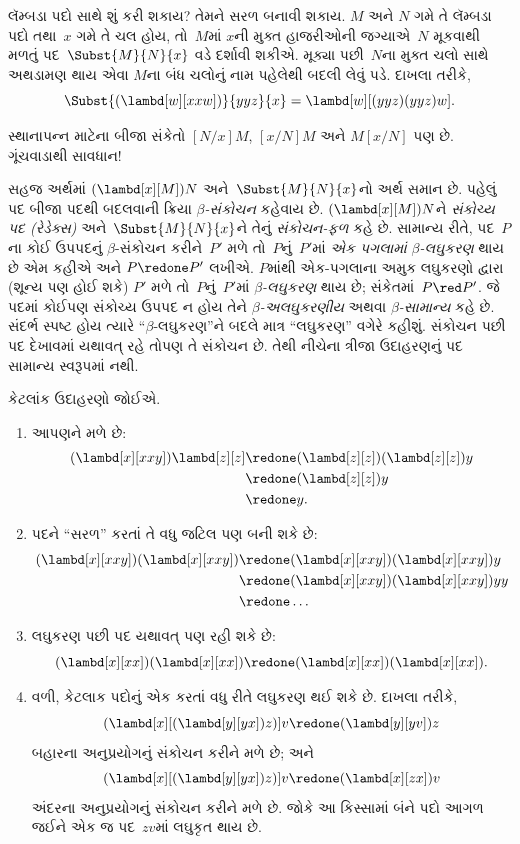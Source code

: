 \label{guunit:OLP-0345}


લૅમ્બડા પદો સાથે શું કરી શકાય? તેમને સરળ બનાવી શકાય.
$M$ અને $N$ ગમે તે લૅમ્બડા પદો તથા~$x$ ગમે તે ચલ હોય, તો~$M$માં
$x$ની મુક્ત હાજરીઓની જગ્યાએ~$N$ મૂકવાથી મળતું પદ~$\Subst{M}{N}{x}$ વડે
દર્શાવી શકીએ. મૂક્યા પછી~$N$ના મુક્ત ચલો સાથે અથડામણ થાય એવા
$M$ના બંધ ચલોનું નામ પહેલેથી બદલી લેવું પડે. દાખલા તરીકે,
\[
\Subst{(\lambd[w][xxw])}{yyz}{x} = \lambd[w][(yyz)(yyz)w].
\]

\begin{digress}
સ્થાનાપન્ન માટેના બીજા સંકેતો $[N/x]M$, $[x/N]M$ અને
$M[x/N]$ પણ છે. ગૂંચવાડાથી સાવધાન!
\end{digress}

સહજ અર્થમાં $(\lambd[x][M])N$ અને~$\Subst{M}{N}{x}$નો અર્થ
સમાન છે. પહેલું પદ બીજા પદથી બદલવાની ક્રિયા
\emph{$\beta$-સંકોચન} કહેવાય છે. $(\lambd[x][M])N$ને
\emph{સંકોચ્ય પદ (રેડેક્સ)} અને~$\Subst{M}{N}{x}$ને તેનું
\emph{સંકોચન-ફળ} કહે છે. સામાન્ય રીતે, પદ~$P$ના કોઈ ઉપપદનું
$\beta$-સંકોચન કરીને~$P'$ મળે તો~$P$નું~$P'$માં
\emph{એક પગલામાં $\beta$-લઘુકરણ} થાય છે એમ કહીએ અને
$P \redone P'$ લખીએ. $P$માંથી એક-પગલાના અમુક લઘુકરણો દ્વારા
(શૂન્ય પણ હોઈ શકે) $P'$ મળે તો~$P$નું~$P'$માં
\emph{$\beta$-લઘુકરણ} થાય છે; સંકેતમાં~$P \red P'$.
જે પદમાં કોઈપણ સંકોચ્ય ઉપપદ ન હોય તેને
\emph{$\beta$-અલઘુકરણીય} અથવા \emph{$\beta$-સામાન્ય}
કહે છે. સંદર્ભ સ્પષ્ટ હોય ત્યારે ``$\beta$-લઘુકરણ''ને બદલે
માત્ર ``લઘુકરણ'' વગેરે કહીશું.
સંકોચન પછી પદ દેખાવમાં યથાવત્ રહે તોપણ તે સંકોચન છે.
તેથી નીચેના ત્રીજા ઉદાહરણનું પદ સામાન્ય સ્વરૂપમાં નથી.

કેટલાંક ઉદાહરણો જોઈએ.
\begin{enumerate}
\item આપણને મળે છે:
\begin{align*}
(\lambd[x][xxy]) \lambd[z][z] & \redone (\lambd[z][z])(\lambd[z][z]) y \\
& \redone (\lambd[z][z]) y \\
& \redone y.
\end{align*}
\item પદને ``સરળ'' કરતાં તે વધુ જટિલ પણ બની શકે છે:
\begin{align*}
(\lambd[x][xxy])(\lambd[x][xxy]) & \redone (\lambd[x][xxy])(\lambd[x][xxy])y \\
& \redone (\lambd[x][xxy])(\lambd[x][xxy])yy \\
& \redone \dots
\end{align*}
\item લઘુકરણ પછી પદ યથાવત્ પણ રહી શકે છે:
\[
(\lambd[x][xx])(\lambd[x][xx]) \redone (\lambd[x][xx])(\lambd[x][xx]).
\]
\item વળી, કેટલાક પદોનું એક કરતાં વધુ રીતે લઘુકરણ થઈ શકે છે.
  દાખલા તરીકે,
\[
(\lambd[x][(\lambd[y][yx]) z)] v \redone (\lambd[y][yv]) z
\]
બહારના અનુપ્રયોગનું સંકોચન કરીને મળે છે; અને
\[
(\lambd[x][(\lambd[y][yx]) z)] v \redone (\lambd[x][zx]) v
\]
અંદરના અનુપ્રયોગનું સંકોચન કરીને મળે છે. જોકે આ કિસ્સામાં
બંને પદો આગળ જઈને એક જ પદ~$zv$માં લઘુકૃત થાય છે.
\end{enumerate}

